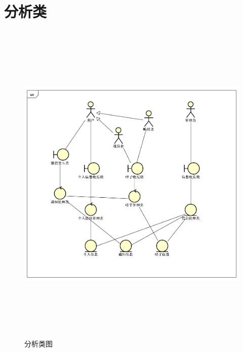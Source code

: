 
\chapter{分析类}

\begin{figure}[htbp]

    \centering
    
    \includegraphics[height=16.0cm,width=14.0cm]{requirement/figures/fenxilei.png}%
    
    \caption{分析类图}
    
    \end{figure}